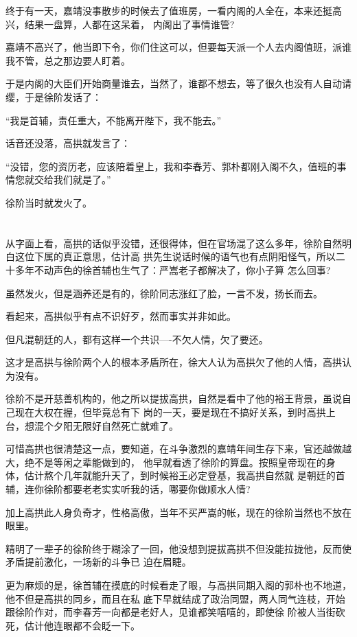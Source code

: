 \documentclass[11pt,a4paper,onecolumn]{article}
\begin{document}
终于有一天，嘉靖没事散步的时候去了值班房，一看内阁的人全在，本来还挺高兴，结果一盘算，人都在这呆着，
内阁出了事情谁管?

嘉靖不高兴了，他当即下令，你们住这可以，但要每天派一个人去内阁值班，派谁我不管，总之那边要人盯着。

于是内阁的大臣们开始商量谁去，当然了，谁都不想去，等了很久也没有人自动请缨，于是徐阶发话了：

``我是首辅，责任重大，不能离开陛下，我不能去。''

话音还没落，高拱就发言了：

``没错，您的资历老，应该陪着皇上，我和李春芳、郭朴都刚入阁不久，值班的事情您就交给我们就是了。''

徐阶当时就发火了。

\section[\thesection]{}

从字面上看，高拱的话似乎没错，还很得体，但在官场混了这么多年，徐阶自然明白这位下属的真正意思，估计高
拱先生说话时候的语气也有点阴阳怪气，所以二十多年不动声色的徐首辅也生气了：严嵩老子都解决了，你小子算
怎么回事?

虽然发火，但是涵养还是有的，徐阶同志涨红了脸，一言不发，扬长而去。

看起来，高拱似乎有点不识好歹，然而事实并非如此。

但凡混朝廷的人，都有这样一个共识----不欠人情，欠了要还。

这才是高拱与徐阶两个人的根本矛盾所在，徐大人认为高拱欠了他的人情，高拱认为没有。

徐阶不是开慈善机构的，他之所以提拔高拱，自然是看中了他的裕王背景，虽说自己现在大权在握，但毕竟总有下
岗的一天，要是现在不搞好关系，到时高拱上台，想混个夕阳无限好自然死亡就难了。

可惜高拱也很清楚这一点，要知道，在斗争激烈的嘉靖年间生存下来，官还越做越大，绝不是等闲之辈能做到的，
他早就看透了徐阶的算盘。按照皇帝现在的身体，估计熬个几年就能升天了，到时候裕王必定登基，我高拱自然就
是朝廷的首辅，连你徐阶都要老老实实听我的话，哪要你做顺水人情?

加上高拱此人身负奇才，性格高傲，当年不买严嵩的帐，现在的徐阶当然也不放在眼里。

精明了一辈子的徐阶终于糊涂了一回，他没想到提拔高拱不但没能拉拢他，反而使矛盾提前激化，一场新的斗争已
迫在眉睫。

更为麻烦的是，徐首辅在摸底的时候看走了眼，与高拱同期入阁的郭朴也不地道，他不但是高拱的同乡，而且在私
底下早就结成了政治同盟，两人同气连枝，开始跟徐阶作对，而李春芳一向都是老好人，见谁都笑嘻嘻的，即使徐
阶被人当街砍死，估计他连眼都不会眨一下。
\end{document}
